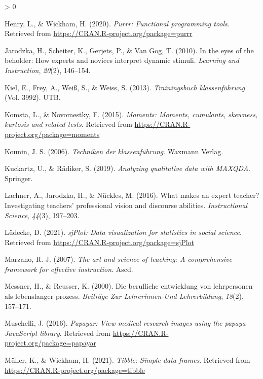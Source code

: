 \documentclass[
  english,
  man,floatsintext]{apa6}
\newlength{\cslhangindent}
\newenvironment{CSLReferences}[2] %
 {%
  \setlength{\parindent}{0pt}
  \ifodd #1 \everypar{\setlength{\hangindent}{\cslhangindent}}\ignorespaces\fi
  \ifnum #2 > 0
  \setlength{\parskip}{#2\baselineskip}
  \fi
 }%
 {}
\begin{document}
\begin{CSLReferences}{1}{0}
\leavevmode\hypertarget{ref-R-purrr}{}%
Henry, L., \& Wickham, H. (2020). \emph{Purrr: Functional programming tools}. Retrieved from \url{https://CRAN.R-project.org/package=purrr}

\leavevmode\hypertarget{ref-jarodzka2010eyes}{}%
Jarodzka, H., Scheiter, K., Gerjets, P., \& Van Gog, T. (2010). In the eyes of the beholder: How experts and novices interpret dynamic stimuli. \emph{Learning and Instruction}, \emph{20}(2), 146--154.

\leavevmode\hypertarget{ref-kiel2013trainingsbuch}{}%
Kiel, E., Frey, A., Weiß, S., \& Weiss, S. (2013). \emph{Trainingsbuch klassenf{ü}hrung} (Vol. 3992). UTB.

\leavevmode\hypertarget{ref-R-moments}{}%
Komsta, L., \& Novomestky, F. (2015). \emph{Moments: Moments, cumulants, skewness, kurtosis and related tests}. Retrieved from \url{https://CRAN.R-project.org/package=moments}

\leavevmode\hypertarget{ref-kounin2006techniken}{}%
Kounin, J. S. (2006). \emph{Techniken der klassenf{ü}hrung}. Waxmann Verlag.

\leavevmode\hypertarget{ref-kuckartz2019analyzing}{}%
Kuckartz, U., \& Rädiker, S. (2019). \emph{Analyzing qualitative data with MAXQDA}. Springer.

\leavevmode\hypertarget{ref-lachner2016makes}{}%
Lachner, A., Jarodzka, H., \& Nückles, M. (2016). What makes an expert teacher? Investigating teachers' professional vision and discourse abilities. \emph{Instructional Science}, \emph{44}(3), 197--203.

\leavevmode\hypertarget{ref-R-sjPlot}{}%
Lüdecke, D. (2021). \emph{sjPlot: Data visualization for statistics in social science}. Retrieved from \url{https://CRAN.R-project.org/package=sjPlot}

\leavevmode\hypertarget{ref-marzano2007art}{}%
Marzano, R. J. (2007). \emph{The art and science of teaching: A comprehensive framework for effective instruction}. Ascd.

\leavevmode\hypertarget{ref-messner2000berufliche}{}%
Messner, H., \& Reusser, K. (2000). Die berufliche entwicklung von lehrpersonen als lebenslanger prozess. \emph{Beitr{ä}ge Zur Lehrerinnen-Und Lehrerbildung}, \emph{18}(2), 157--171.

\leavevmode\hypertarget{ref-R-papayar}{}%
Muschelli, J. (2016). \emph{Papayar: View medical research images using the papaya JavaScript library}. Retrieved from \url{https://CRAN.R-project.org/package=papayar}

\leavevmode\hypertarget{ref-R-tibble}{}%
Müller, K., \& Wickham, H. (2021). \emph{Tibble: Simple data frames}. Retrieved from \url{https://CRAN.R-project.org/package=tibble}


\end{CSLReferences}
\end{document}

